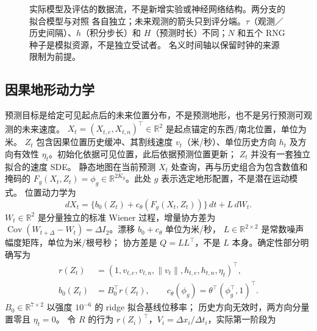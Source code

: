 \documentclass[UTF8,11pt]{ctexart}
\newcommand{\R}{\mathbb{R}}
\begin{document}
\begin{figure}[p]
\caption{实际模型及评估的数据流，不是新增实验或神经网络结构。两分支的拟合模型与对照
各自独立；未来观测的箭头只到评分端。$\tau$（观测／历史间隔）、$h$（积分步长）和
$H$（预测时长）不同；$N$ 和五个 RNG 种子是模拟资源，不是独立受试者。
名义时间轴以保留时钟的来源限制为前提。}
\label{fig:model-data-flow}
\end{figure}
\subsection{因果地形动力学}
预测目标是给定可见起点后的未来位置分布，不是预测地形，也不是另行预测可观测的未来速度。
\(X_t=(X_{t,e},X_{t,n})^\top\in\R^2\) 是起点锚定的东西/南北位置，单位为米。
\(Z_t\) 包含因果位置历史缓冲、其割线速度 \(v_t\)（米/秒）、单位历史方向 \(h_t\)
及方向有效性 \(\eta_t\)。初始化依据可见位置，此后依据预测位置更新；
\(Z_t\) 并没有一套独立拟合的速度 SDE。
静态地图在当前预测 \(X_t\) 处查询，再与历史组合为包含数值和掩码的
\(F_g(X_t,Z_t)=\phi_g\in\R^{2K_g}\)。此处 \(g\) 表示选定地形配置，不是潜在运动模式。
位置动力学为
\begin{equation}
dX_t=\{b_0(Z_t)+c_\theta(F_g(X_t,Z_t))\}\,dt+L\,dW_t.
\label{eq:terrain-sde}
\end{equation}
\(W_t\in\R^2\) 是分量独立的标准 Wiener 过程，增量协方差为
\(\operatorname{Cov}(W_{t+\Delta}-W_t)=\Delta I_2\)。漂移 \(b_0+c_\theta\) 单位为米/秒，
\(L\in\R^{2\times2}\) 是常数噪声幅度矩阵，单位为米/根号秒；
协方差是 \(Q=LL^\top\)，不是 \(L\) 本身。确定性部分明确写为
\begin{equation}
\begin{aligned}
r(Z_t)&=(1,v_{t,e},v_{t,n},\|v_t\|,h_{t,e},h_{t,n},\eta_t)^\top,\\
b_0(Z_t)&=B_0^\top r(Z_t),\qquad
c_\theta(\phi_g)=\theta^\top(\phi_g^\top,1)^\top.
\end{aligned}
\label{eq:drift-components}
\end{equation}
\(B_0\in\R^{7\times2}\) 以强度 \(10^{-6}\) 的 ridge 拟合基线位移率；
历史方向无效时，两方向分量置零且 \(\eta_t=0\)。
令 \(R\) 的行为 \(r(Z_i)^\top\)，\(V_i=\Delta x_i/\Delta t_i\)，实际第一阶段为
\end{document}
